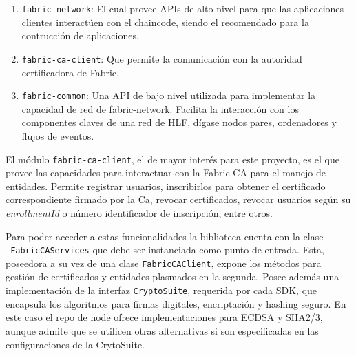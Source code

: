 \begin{enumerate}
	\item \texttt{fabric-network}: El cual provee APIs de alto nivel para que las aplicaciones clientes interact\'uen con el chaincode, siendo el recomendado para la contrucci\'on de aplicaciones.
	
	\item \texttt{fabric-ca-client}: Que permite la comunicaci\'on con la autoridad certificadora de Fabric.
	
	\item \texttt{fabric-common}: Una API de bajo nivel utilizada para implementar la capacidad de red de fabric-network. Facilita la interacci\'on con los componentes claves de una red de HLF, d\'igase nodos pares, ordenadores y flujos de eventos.
\end{enumerate}


El m\'odulo \texttt{fabric-ca-client}, el de mayor inter\'es para este proyecto, es el que provee las capacidades para interactuar con la Fabric CA para el manejo de entidades.  Permite registrar usuarios, inscribirlos para obtener el certificado correspondiente firmado por la Ca,  revocar certificados, revocar usuarios seg\'un su \emph{enrollmentId} o n\'umero identificador de inscripci\'on, entre otros.

Para poder acceder a estas funcionalidades la biblioteca cuenta con la clase 
\\
\texttt{ FabricCAServices} que debe ser instanciada como punto de entrada. Esta, poseedora a su vez de una clase \texttt{FabricCAClient}, expone los m\'etodos para gesti\'on de certificados y entidades plasmados en la segunda. Posee adem\'as una implementaci\'on de la interfaz \texttt{CryptoSuite}, requerida por cada SDK, que encapsula los algoritmos para firmas digitales, encriptaci\'on y hashing seguro. En este caso el repo de node ofrece implementaciones para ECDSA y SHA2/3, aunque admite que se utilicen otras alternativas si son especificadas en las configuraciones de la CrytoSuite.





